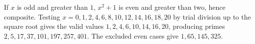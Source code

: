 If $x$ is odd and greater than $1$, $x^2+1$ is even and greater than two, hence composite. Testing $x=0,1,2,4,6,8,10,12,14,16,18,20$ by trial division up to the square root gives the valid values $\boxed{1,2,4,6,10,14,16,20}$, producing primes $2,5,17,37,101,197,257,401$. The excluded even cases give $1,65,145,325$.
